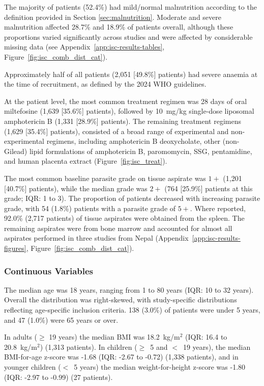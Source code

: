 The majority of patients (52.4\%) had mild/normal malnutrition according to the definition provided in Section \ref{sec:malnutrition}. Moderate and severe malnutrition affected 28.7\% and 18.9\% of patients overall, although these proportions varied significantly across studies and were affected by considerable missing data (see Appendix~\ref{app:isc-results-tables}, Figure~\ref{fig:isc_comb_dist_cat}).

Approximately half of all patients (2,051 [49.8\%] patients) had severe anaemia at the time of recruitment, as defined by the 2024 WHO guidelines\cite{who_haem2024}.

At the patient level, the most common treatment regimen was 28 days of oral miltefosine (1,639 [35.6\%] patients), followed by 10~mg/kg single-dose liposomal amphotericin B (1,331 [28.9\%] patients). The remaining treatment regimens (1,629 [35.4\%] patients), consisted of a broad range of experimental and non-experimental regimens, including amphotericin B deoxycholate, other (non-Gilead) lipid formulations of amphotericin B, paromomycin, SSG, pentamidine, and human placenta extract (Figure~\ref{fig:isc_treat}).

The most common baseline parasite grade on tissue aspirate was $1+$ (1,201 [40.7\%] patients), while the median grade was $2+$ (764 [25.9\%] patients at this grade; IQR: 1 to 3). The proportion of patients decreased with increasing parasite grade, with 54 (1.8\%) patients with a parasite grade of $5+$. Where reported, 92.0\% (2,717 patients) of tissue aspirates were obtained from the spleen. The remaining aspirates were from bone marrow and accounted for almost all aspirates performed in three studies from Nepal\cite{rijal2010a,rijal2003,koirala2003} (Appendix~\ref{app:isc-results-figures}, Figure~\ref{fig:isc_comb_dist_cat}).



\subsubsection{Continuous Variables}

The median age was 18 years, ranging from 1 to 80 years (IQR: 10 to 32 years). Overall the distribution was right-skewed, with study-specific distributions reflecting age-specific inclusion criteria. 138 (3.0\%) of patients were under 5 years, and 47 (1.0\%) were 65 years or over.

In adults ($\geq$ 19 years) the median BMI was 18.2~kg/m$^2$ (IQR: 16.4 to 20.8~kg/m$^2$) (1,313 patients). In children ($\geq$~5 and $<$~19 years), the median BMI-for-age z-score was -1.68 (IQR: -2.67 to -0.72) (1,338 patients), and in younger children ($<$~5 years) the median weight-for-height z-score was -1.80 (IQR: -2.97 to -0.99) (27 patients).

